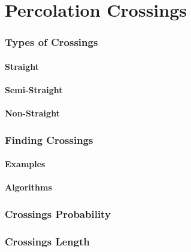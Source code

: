 \section{Percolation Crossings}

\subsubsection{Types of Crossings}
\paragraph{Straight}
\paragraph{Semi-Straight}
\paragraph{Non-Straight}

\subsubsection{Finding Crossings}
\paragraph{Examples}
\paragraph{Algorithms}

\subsubsection{Crossings Probability}

\subsubsection{Crossings Length}

